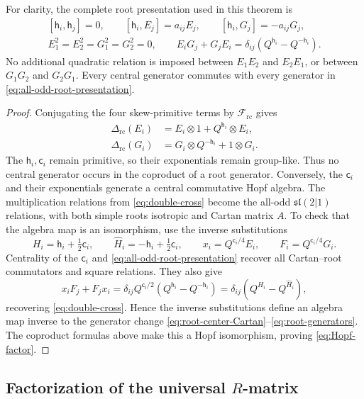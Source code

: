 \documentclass[11pt,a4paper]{article}
\newcommand{\ot}{\otimes}
\newcommand{\rc}{\mathrm{rc}}
\theoremstyle{definition}
\theoremstyle{remark}
\begin{document}
For clarity, the complete root presentation used in this theorem is
\begin{equation}\label{eq:all-odd-root-presentation}
\begin{gathered}
 [\mathsf h_i,\mathsf h_j]=0,
 \qquad [\mathsf h_i,E_j]=a_{ij}E_j,
 \qquad [\mathsf h_i,G_j]=-a_{ij}G_j,\\
 E_1^2=E_2^2=G_1^2=G_2^2=0,
 \qquad
 E_iG_j+G_jE_i
 =\delta_{ij}(Q^{\mathsf h_i}-Q^{-\mathsf h_i}).
\end{gathered}
\end{equation}
No additional quadratic relation is imposed between \(E_1E_2\) and
\(E_2E_1\), or between \(G_1G_2\) and \(G_2G_1\).  Every central
generator commutes with every generator in
\eqref{eq:all-odd-root-presentation}.

\begin{proof}
Conjugating the four skew-primitive terms by
\(\mathcal F_{\rc}\) gives
\[
\begin{aligned}
 \Delta_{\rc}(E_i)&=E_i\ot1+Q^{\mathsf h_i}\ot E_i,\\
 \Delta_{\rc}(G_i)&=G_i\ot Q^{-\mathsf h_i}+1\ot G_i.
\end{aligned}
\]
The \(\mathsf h_i,\mathsf c_i\) remain primitive, so their
exponentials remain group-like.  Thus no central generator occurs in the coproduct of
a root generator.  Conversely, the \(\mathsf c_i\) and their exponentials
generate a central commutative Hopf algebra.  The multiplication relations
from \eqref{eq:double-cross} become the all-odd
\(\mathfrak{sl}(2|1)\) relations, with both simple roots isotropic and
Cartan matrix \(A\).  To check that the algebra map is an
isomorphism, use the inverse substitutions
\[
 H_i=\mathsf h_i+\tfrac12\mathsf c_i,\qquad
 \widehat H_i=-\mathsf h_i+\tfrac12\mathsf c_i,\qquad
 x_i=Q^{\mathsf c_i/4}E_i,\qquad
 F_i=Q^{\mathsf c_i/4}G_i.
\]
Centrality of the \(\mathsf c_i\) and
\eqref{eq:all-odd-root-presentation} recover all Cartan--root
commutators and square relations.  They also give
\[
 x_iF_j+F_jx_i
 =\delta_{ij}Q^{\mathsf c_i/2}
 (Q^{\mathsf h_i}-Q^{-\mathsf h_i})
 =\delta_{ij}(Q^{H_i}-Q^{\widehat H_i}),
\]
recovering \eqref{eq:double-cross}.  Hence the inverse substitutions
define an algebra map inverse to the generator change
\eqref{eq:root-center-Cartan}--\eqref{eq:root-generators}.
The coproduct formulas above make this a Hopf isomorphism, proving
\eqref{eq:Hopf-factor}.
\end{proof}

\subsection[Factorization of the universal R-matrix]
{Factorization of the universal \(R\)-matrix}
\end{document}
